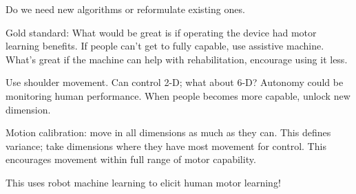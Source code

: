 Do we need new algorithms or reformulate existing ones.

Gold standard: What would be great is if operating the device had motor learning benefits. If people can't get to fully capable, use assistive machine. What's great if the machine can help with rehabilitation, encourage using it less.

Use shoulder movement. Can control 2-D; what about 6-D? Autonomy could be monitoring human performance. When people becomes more capable, unlock new dimension. 

Motion calibration: move in all dimensions as much as they can. This defines variance; take dimensions where they have most movement for control. This encourages movement within full range of motor capability.



This uses robot machine learning to elicit human motor learning!

